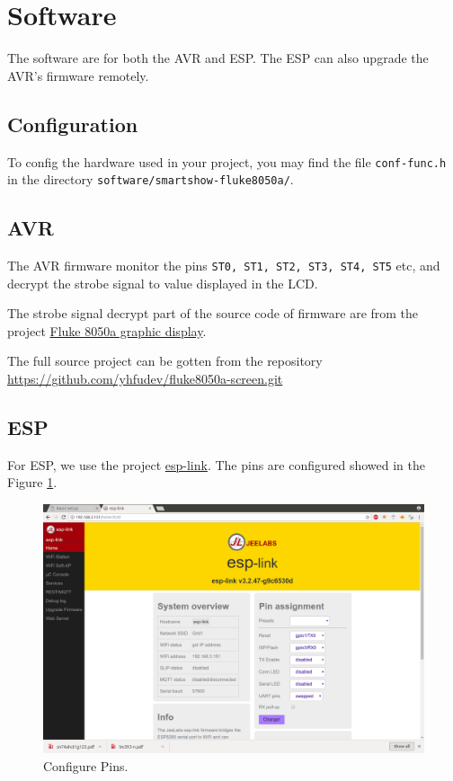 \documentclass[a4paper,10pt]{article}
\begin{document}
\section{Software}

The software are for both the AVR and ESP.
The ESP can also upgrade the AVR's firmware remotely.



\subsection{Configuration}

To config the hardware used in your project, you may find the file
\texttt{conf-func.h} in the directory \texttt{software/smartshow-fluke8050a/}.







\subsection{AVR}
The AVR firmware monitor the pins \texttt{ST0, ST1, ST2, ST3, ST4, ST5} etc,
and decrypt the strobe signal to value displayed in the LCD.


The strobe signal decrypt part of the source code of firmware are from the project
\href{http://vondervotteimittiss.com/belfry/?p=180}{Fluke 8050a graphic display}.


The full source project can be gotten from the repository \url{https://github.com/yhfudev/fluke8050a-screen.git}



\subsection{ESP}

For ESP, we use the project \href{https://github.com/jeelabs/esp-link.git}{esp-link}.
The pins are configured showed in the Figure \ref{fig:smartshow-confwin}.

\begin{figure}[h!t] \centering
    \includegraphics[width=0.8\linewidth]{figures/smartshow-confwin.png}
    \caption{Configure Pins.} \label{fig:smartshow-confwin}
\end{figure}
\end{document}
